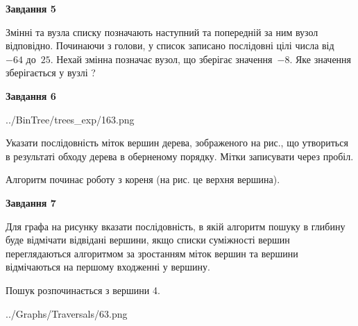 \documentclass[12pt, ukrainian]{article}
\begin{document}
{\begin {large}
{\begin {center}\textbf{Завдання 5}\end {center}}\par
Змінні  та  вузла списку позначають наступний та попередній за ним вузол відповідно. Починаючи з голови, у список записано послідовні цілі числа від~$-64$ до~$25$. Нехай змінна  позначає вузол, що зберігає значення~$-8$.
Яке значення зберігається у вузлі  ?\par
\newpage

{\begin {center}\textbf{Завдання 6}\end {center}}\par

\begin{center}
	{../BinTree/trees_exp/163.png}
\end{center}
Указати послідовність міток вершин дерева, зображеного на рис., що утвориться в результаті обходу дерева в оберненому порядку. Мітки записувати через пробіл.\par Алгоритм починає роботу з кореня (на рис. це верхня вершина).\par
\newpage

{\begin {center}\textbf{Завдання 7}\end {center}}\par
Для графа на рисунку вказати послідовність, в якій алгоритм пошуку в глибину буде відмічати відвідані вершини, якщо списки суміжності вершин переглядаються алгоритмом за зростанням міток вершин та вершини відмічаються на першому вход\-женні у вершину.\par
Пошук розпочинається з вершини 4.\par

\begin{center}
	{../Graphs/Traversals/63.png}
\end{center}\par
\newpage


\end{large}}
\end{document}
